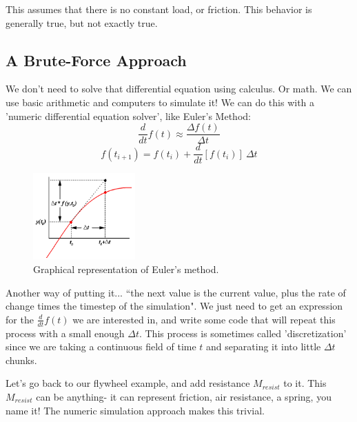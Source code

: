 	This assumes that there is no constant load, or friction.
	This behavior is generally true, but not exactly true.
	
	\subsection{A Brute-Force Approach}
	We don't need to solve that differential equation using calculus. Or math. We can use basic arithmetic and computers to simulate it! We can do this with a 'numeric differential equation solver', like Euler's Method:
	\begin{equation}
		\frac{d}{dt} f(t) \approx \frac{\Delta f(t)}{\Delta t}
	\end{equation}\begin{equation}
		f(t_{i+1}) = f(t_{i}) + \frac{d}{dt}[f(t_{i})]\ {\Delta t}
	\end{equation}
	
	\begin{figure}[H]
		\includegraphics[width=0.35\textwidth]{imgs/euler_method.png}
		\caption{Graphical representation of Euler's method.}
	\end{figure}
	
	Another way of putting it... ``the next value is the current value, plus the rate of change times the timestep of the simulation". 	We just need to get an expression for the $\frac{d}{dt}f(t)$ we are interested in, and write some code that will repeat this process with a small enough $\Delta t$. This process is sometimes called 'discretization' since we are taking a continuous field of time $t$ and separating it into little $\Delta t$ chunks.	
		
	Let's go back to our flywheel example, and add resistance $M_{resist}$ to it. This $M_{resist}$ can be anything- it can represent friction, air resistance, a spring, you name it! The numeric simulation approach makes this trivial.
	
